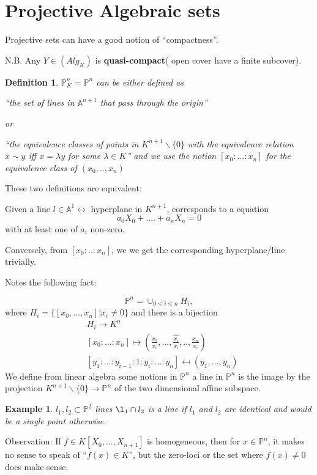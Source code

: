 \documentclass[11pt]{article}
\newtheorem{dfn}[thm]{Definition}
\newtheorem{ex}[thm]{Example}
\newcommand{\affn}{\mathbb A}
\newcommand{\proj}{\mathbb P}
\newcommand{\lrta}{\longrightarrow}
\newcommand{\llrta}{\longleftrightarrow}
\begin{document}
\section*{Projective Algebraic sets}

Projective sets can have a good notion of ``compactness''.

N.B. Any $Y\in (Alg_K)$ is \textbf{quasi-compact}( open cover have a finite subcover).

\begin{dfn}
$\proj^n_K=\proj^n$ can be either defined as 

``the set of  lines in $\affn^{n+1}$ that pass through the origin''

or

``the equivalence classes of points in $K^{n+1}\backslash \{0\}$ with the equivalence relation $x\sim y$ iff $x=\lambda y$ for some $\lambda \in K$'' and we use the notion $[x_0:...:x_n]$ for the equivalence class of $(x_0,..,x_n)$
\end{dfn}

These two definitions are equivalent: 

Given a line $l\in \affn^1\llrta $ hyperplane in $K^{n+1}$, corresponds to a equation
$$
a_0X_0+....+a_n X_n=0
$$
with at least one of $a_i$ non-zero.

Conversely, from $[x_0:..:x_n]$, we  we get the corresponding hyperplane/line trivially.


Notes the following fact:

$$
\proj^n=\cup_{0\leq i\leq n} H_i,
$$
where $H_i=\{[x_0,...,x_n]|x_i\neq 0\}$ and there is a bijection 
$$
\begin{aligned}
&H_i\lrta K^n\\
&[x_0:...:x_n]\longmapsto\left(\frac{x_0}{x_i},...,\widehat{\frac{x_i}{x_i}},..,\frac{x_n}{x_i}\right)\\
&
[y_1:...:y_{i-1}:1:y_{i}:...:y_n]\mapsfrom(y_1,...,y_n)
\end{aligned}
$$
We define from linear algebra some notions in $\proj^n$ a line in $\proj^n$ is the image by the projection $K^{n+1}\backslash \{0\}\lrta \proj^n$ of the two dimensional affine subspace.

\begin{ex}
$l_1,l_2\subset \proj^2$ lines $\l_1\cap l_2$ is a line if $l_1$ and $l_2$ are identical and would be a single point otherwise.
\end{ex}

Observation: If $f\in K[X_0,...,X_{n+1}]$ is homogeneous, then for $x\in \proj^n$, it makes no sense to speak of ``$f(x)\in K$'', but the zero-loci or the set where $f(x)\neq 0$ does make sense.
\end{document}
